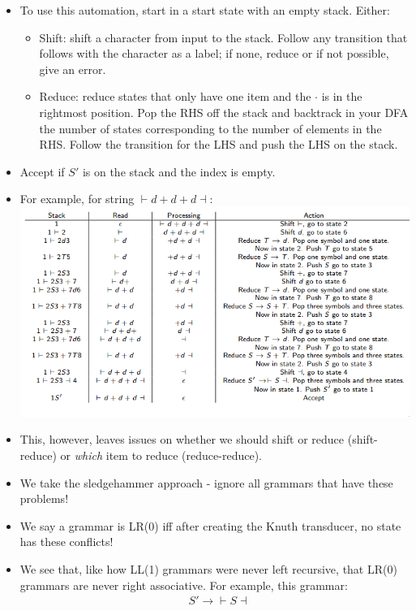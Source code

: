 \documentclass[12pt]{article}
\begin{document}
\begin{itemize}
    \item To use this automation, start in a start state with an empty stack. Either:
        \begin{itemize}
            \item Shift: shift a character from input to the stack.  Follow any transition that follows with the character as a label; if none, reduce or if not possible, give an error.
            \item Reduce: reduce states that only have one item and the $\cdot$ is in the rightmost position.  Pop the RHS off the stack and backtrack in your DFA the number of states corresponding to the number of elements in the RHS.  Follow the transition for the LHS and push the LHS on the stack.
        \end{itemize}
    \item Accept if $S'$ is on the stack and the index is empty.
    \item For example, for string $\vdash d + d + d \dashv$: \\
        \includegraphics[scale=0.5]{lrauto.png}
    \item This, however, leaves issues on whether we should shift or reduce (shift-reduce) or \emph{which} item to reduce (reduce-reduce).
    \item We take the sledgehammer approach - ignore all grammars that have these problems!
    \item We say a grammar is LR(0) iff after creating the Knuth transducer, no state has these conflicts!
    \item We see that, like how LL(1) grammars were never left recursive, that LR(0) grammars are never right associative.  For example, this grammar:
        \begin{align*}
            &S' \rightarrow \vdash S \dashv \\

\end{align*}
\end{itemize}
\end{document}
